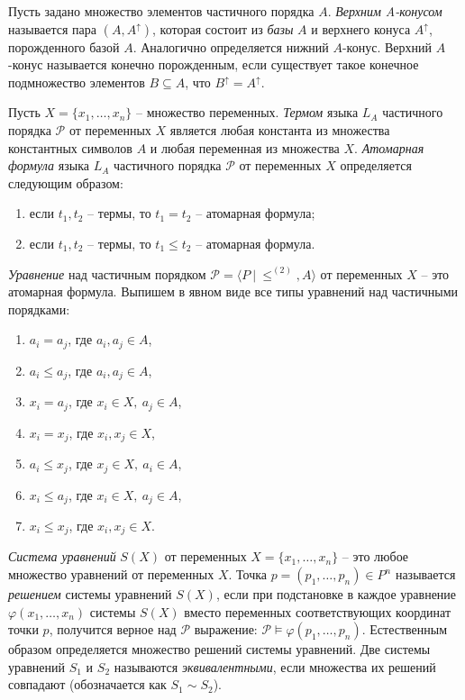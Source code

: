 \documentclass[12pt]{article}
\theoremstyle{break}
\def\P{\mathcal{P}}
\begin{document}
		Пусть задано множество элементов частичного порядка $A$. \textit{Верхним A-конусом} называется пара $(A, A^{\uparrow})$, которая состоит из \textit{базы} $A$ и верхнего конуса $A^{\uparrow}$, порожденного базой $A$. Аналогично определяется нижний $A$-конус. Верхний $A$-конус называется конечно порожденным, если существует такое конечное подмножество элементов $B\subseteq A$, что $B^{\uparrow} = A^{\uparrow}$.

		Пусть $X = \{x_1,\dots,x_n\}$ -- множество переменных. \textit{Термом} языка $L_A$ частичного порядка $\P$ от переменных $X$ является любая константа из множества константных символов $A$ и любая переменная из множества $X$. \textit{Атомарная формула} языка $L_A$ частичного порядка $\P$ от переменных $X$ определяется следующим образом:
		\begin{enumerate}
			\item если $t_1, t_2$ -- термы, то $t_1=t_2$ -- атомарная формула;
			\item если $t_1, t_2$ -- термы, то $t_1\leqslant t_2$ -- атомарная формула.
		\end{enumerate}

		\textit{Уравнение} над частичным порядком $\P = \langle P~|~\leqslant^{(2)}, A\rangle$ от переменных $X$ -- это атомарная формула. Выпишем в явном виде все типы уравнений над частичными порядками:
		\begin{enumerate}
			\item $a_i=a_j$, где $a_i, a_j\in A$,
			\item $a_i\leqslant a_j$, где $a_i, a_j\in A$,
			\item $x_i=a_j$, где $x_i\in X,~a_j\in A$,
			\item $x_i=x_j$, где $x_i, x_j\in X$,
			\item $a_i\leqslant x_j$, где $x_j\in X,~a_i\in A$,
			\item $x_i\leqslant a_j$, где $x_i\in X,~a_j\in A$,
			\item $x_i\leqslant x_j$, где $x_i, x_j\in X$.
		\end{enumerate}

		\textit{Система уравнений} $S(X)$ от переменных $X=\{x_1,\dots,x_n\}$ -- это любое множество уравнений от переменных $X$. Точка $p=(p_1,\dots,p_n)\in P^n$ называется \textit{решением} системы уравнений $S(X)$, если при подстановке в каждое уравнение $\varphi(x_1,\dots,x_n)$ системы $S(X)$ вместо переменных соответствующих координат точки $p$, получится верное над $\P$ выражение: $\P\vDash \varphi(p_1,\dots,p_n)$. Естественным образом определяется множество решений системы уравнений. Две системы уравнений $S_1$ и $S_2$ называются \textit{эквивалентными}, если множества их решений совпадают (обозначается как $S_1\sim S_2$).
\end{document}
